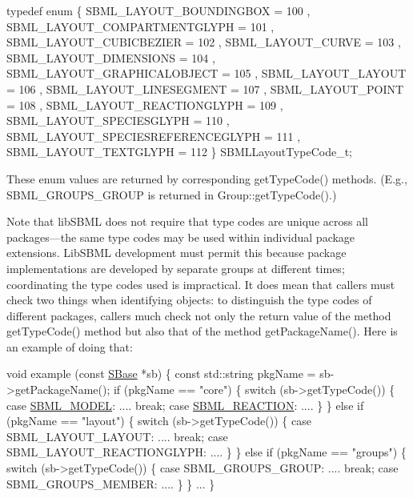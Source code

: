 \begin{DoxyCode}
\textcolor{keyword}{typedef} \textcolor{keyword}{enum}
\{
   SBML\_LAYOUT\_BOUNDINGBOX           = 100
 , SBML\_LAYOUT\_COMPARTMENTGLYPH      = 101
 , SBML\_LAYOUT\_CUBICBEZIER           = 102
 , SBML\_LAYOUT\_CURVE                 = 103
 , SBML\_LAYOUT\_DIMENSIONS            = 104
 , SBML\_LAYOUT\_GRAPHICALOBJECT       = 105
 , SBML\_LAYOUT\_LAYOUT                = 106
 , SBML\_LAYOUT\_LINESEGMENT           = 107
 , SBML\_LAYOUT\_POINT                 = 108
 , SBML\_LAYOUT\_REACTIONGLYPH         = 109
 , SBML\_LAYOUT\_SPECIESGLYPH          = 110
 , SBML\_LAYOUT\_SPECIESREFERENCEGLYPH = 111
 , SBML\_LAYOUT\_TEXTGLYPH             = 112
\} SBMLLayoutTypeCode\_t;
\end{DoxyCode}


These enum values are returned by corresponding {\ttfamily get\+Type\+Code()} methods. (E.\+g., {\ttfamily S\+B\+M\+L\+\_\+\+G\+R\+O\+U\+P\+S\+\_\+\+G\+R\+O\+UP} is returned in {\ttfamily Group\+::get\+Type\+Code()}.)

Note that lib\+S\+B\+ML does not require that type codes are unique across all packages---the same type codes may be used within individual package extensions. Lib\+S\+B\+ML development must permit this because package implementations are developed by separate groups at different times; coordinating the type codes used is impractical. It does mean that callers must check two things when identifying objects\+: to distinguish the type codes of different packages, callers much check not only the return value of the method {\ttfamily get\+Type\+Code()} method but also that of the method {\ttfamily get\+Package\+Name()}. Here is an example of doing that\+: 
\begin{DoxyCode}
\textcolor{keywordtype}{void} example (\textcolor{keyword}{const} \hyperlink{class_s_base}{SBase} *sb)
\{
  \textcolor{keyword}{const} std::string pkgName = sb->getPackageName();
  \textcolor{keywordflow}{if} (pkgName == \textcolor{stringliteral}{"core"}) \{
    \textcolor{keywordflow}{switch} (sb->getTypeCode()) \{
      \textcolor{keywordflow}{case} \hyperlink{_s_b_m_l_type_codes_8h_aa283dddfd7671179362b2f38e2938cfea3c866be107d7858b6dd1e978ed103028}{SBML\_MODEL}:
         ....
         \textcolor{keywordflow}{break};
      \textcolor{keywordflow}{case} \hyperlink{_s_b_m_l_type_codes_8h_aa283dddfd7671179362b2f38e2938cfea54de874fd61e13450bdf024d41a336c9}{SBML\_REACTION}:
         ....
    \}
  \}
  \textcolor{keywordflow}{else} \textcolor{keywordflow}{if} (pkgName == \textcolor{stringliteral}{"layout"}) \{
    \textcolor{keywordflow}{switch} (sb->getTypeCode()) \{
      \textcolor{keywordflow}{case} SBML\_LAYOUT\_LAYOUT:
         ....
         \textcolor{keywordflow}{break};
      \textcolor{keywordflow}{case} SBML\_LAYOUT\_REACTIONGLYPH:
         ....
    \}
  \}
  \textcolor{keywordflow}{else} \textcolor{keywordflow}{if} (pkgName == \textcolor{stringliteral}{"groups"}) \{
    \textcolor{keywordflow}{switch} (sb->getTypeCode()) \{
      \textcolor{keywordflow}{case} SBML\_GROUPS\_GROUP:
         ....
         \textcolor{keywordflow}{break};
      \textcolor{keywordflow}{case} SBML\_GROUPS\_MEMBER:
         ....
    \}
  \}
  ...
\}
\end{DoxyCode}


